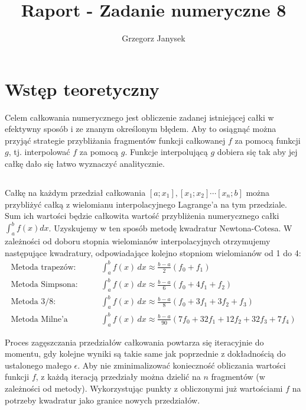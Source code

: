 \documentclass[11pt]{extarticle}
\author{Grzegorz Janysek}
\title{Raport - Zadanie numeryczne 8}
\begin{document}
	\maketitle

	\section{Wstęp teoretyczny}
	Celem całkowania numerycznego jest obliczenie zadanej istniejącej całki w efektywny sposób i ze znanym określonym błędem.
	Aby to osiągnąć można przyjąć strategie przybliżania fragmentów funkcji całkowanej \(f\) za pomocą funkcji \(g\), tj. interpolować \(f\) za pomocą \(g\).
	Funkcje interpolującą \(g\) dobiera się tak aby jej całkę dało się łatwo wyznaczyć analitycznie.

	\subsection{}
	Całkę na każdym przedział całkowania \([a; x_1], [x_1; x_2] \dotsm [x_n; b]\) można przybliżyć całką z wielomianu interpolacyjnego Lagrange'a na tym przedziale.
	Sum ich wartości będzie całkowita wartość przybliżenia numerycznego całki \( \int_a^b f(x) dx\).
	Uzyskujemy w ten sposób metodę kwadratur Newtona-Cotesa.
	W zależności od doboru stopnia wielomianów interpolacyjnych otrzymujemy następujące kwadratury, odpowiadające kolejno stopniom wielomianów od 1 do 4:
	\begin{align}
		\text{Metoda trapezów:} \qquad &
		\int_a^b f(x)\,dx \approx \frac{b-a}{2}(f_0 + f_1) \\
		\text{Metoda Simpsona:} \qquad &
		\int_a^b f(x)\,dx \approx \frac{b-a}{6}(f_0 + 4f_1 + f_2) \\
		\text{Metoda 3/8:} \qquad &
		\int_a^b f(x)\,dx \approx \frac{b-a}{8}(f_0 + 3f_1 + 3f_2 + f_3) \\
		\text{Metoda Milne'a} \qquad &
		\int_a^b f(x)\,dx \approx \frac{b-a}{90}(7f_0 + 32f_1 + 12f_2 + 32f_3 + 7f_4)
	\end{align}

	Proces zagęszczania przedziałów całkowania powtarza się iteracyjnie do momentu, gdy kolejne wyniki są takie same jak poprzednie z dokładnością do ustalonego małego \(\epsilon\).
	Aby nie zminimalizować konieczność obliczania wartości funkcji \(f\), z każdą iteracją przedziały można dzielić na \(n\) fragmentów (w zależności od metody).
	Wykorzystując punkty z obliczonymi już wartościami \(f\) na potrzeby kwadratur jako granice nowych przedziałów.
	
\end{document}
